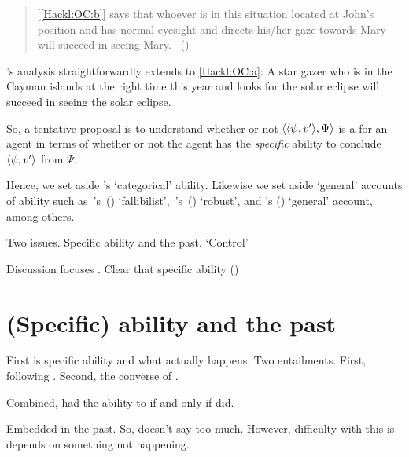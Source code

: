 \begin{note}
\begin{quote}
    [\ref{Hackl:OC:b}] says that whoever is in this situation located at John's position and has normal eyesight and directs his/her gaze towards Mary will succeed in seeing Mary.%
    \mbox{ }\hfill\mbox{(\citeyear[39]{Hackl:1998tt})}
  \end{quote}
  \citeauthor{Hackl:1998tt}'s analysis straightforwardly extends to \ref{Hackl:OC:a}:
  A star gazer who is in the Cayman islands at the right time this year and looks for the solar eclipse will succeed in seeing the solar eclipse.

  So, a tentative proposal is to understand whether or not \(\langle \langle \psi, v' \rangle, \Psi \rangle\) is a \fc{} for an agent in terms of whether or not the agent has the \emph{specific} ability to conclude \(\langle\psi, v'\rangle\) from \(\Psi\).

  Hence, we set aside \citeauthor{Austin:1961vz}'s `categorical' ability.
  Likewise we set aside `general' accounts of ability such as~\citeauthor{Carter:2021wd}'s~(\citeyear{Carter:2021wd}) `fallibilist',~\citeauthor{Kikkert:2022wp}'s~(\citeyear{Kikkert:2022wp}) `robust', and \citeauthor{Maier:2013vk}'s (\citeyear{Maier:2013vk}) `general' account, among others.

  Two issues.
  Specific ability and the past.
  `Control'

  Discussion focuses \textcite{Boylan:2020aa}.
  Clear that specific ability (\citeyear[23, fn.3]{Boylan:2020aa})
\end{note}

\section{(Specific) ability and the past}
\label{cha:sec:fcs-def:ability:past}

\begin{note}
  First is specific ability and what actually happens.
  Two entailments.
  First, \BoyPS{} following \textcite{Boylan:2020aa}.
  Second, \BoyPSC{} the converse of \BoyPS{}.

  Combined, had the ability to if and only if did.

  Embedded in the past.
  So, doesn't say too much.
  However, difficulty with this is \fc{} depends on something not happening.
\end{note}

